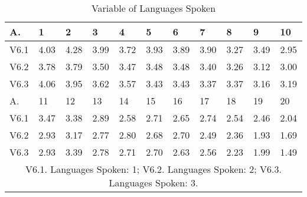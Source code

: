 \documentclass[english]{textolivre}
\begin{document}
\begin{table}[htpb]
\caption{Variable of Languages Spoken}
\label{figure7}
\centering
\begin{tabular}{lllllllllll}
\toprule
A. & 1 & 2 & 3 & 4 & 5 & 6 & 7 & 8 & 9 & 10
\\ 
\midrule
V6.1 & 4.03 & 4.28 & 3.99 & 3.72 & 3.93 & 3.89 & 3.90 & 3.27 & 3.49 & 2.95
\\
V6.2 & 3.78 & 3.79 & 3.50 & 3.47 & 3.48 & 3.48 & 3.40 & 3.26 & 3.12 & 3.00
\\
V6.3 & 4.06 & 3.95 & 3.62 & 3.57 & 3.43 & 3.43 & 3.37 & 3.37 & 3.16 & 3.19
\\
\midrule
A. & 11 & 12 & 13 & 14 & 15 & 16 & 17 & 18 & 19 & 20
\\
\midrule
V6.1 & 3.47 & 3.38 & 2.89 & 2.58 & 2.71 & 2.65 & 2.74 & 2.54 & 2.46 & 2.04
\\
V6.2 & 2.93 & 3.17 & 2.77 & 2.80 & 2.68 & 2.70 & 2.49 & 2.36 & 1.93 & 1.69
\\
V6.3 & 2.93 & 3.39 & 2.78 & 2.71 & 2.70 & 2.63 & 2.56 & 2.23 & 1.99 & 1.49
\\ 
\midrule
\multicolumn{11}{c}{V6.1. Languages Spoken: 1; V6.2. Languages Spoken: 2; V6.3. Languages Spoken: 3.}
\\
\bottomrule
\end{tabular}
\end{table}
\end{document}
